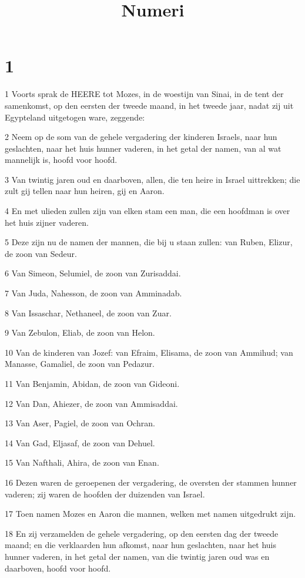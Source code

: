 

\title{Numeri}



\chapter{1}

\par 1 Voorts sprak de HEERE tot Mozes, in de woestijn van Sinai, in de tent der samenkomst, op den eersten der tweede maand, in het tweede jaar, nadat zij uit Egypteland uitgetogen ware, zeggende:
\par 2 Neem op de som van de gehele vergadering der kinderen Israels, naar hun geslachten, naar het huis hunner vaderen, in het getal der namen, van al wat mannelijk is, hoofd voor hoofd.
\par 3 Van twintig jaren oud en daarboven, allen, die ten heire in Israel uittrekken; die zult gij tellen naar hun heiren, gij en Aaron.
\par 4 En met ulieden zullen zijn van elken stam een man, die een hoofdman is over het huis zijner vaderen.
\par 5 Deze zijn nu de namen der mannen, die bij u staan zullen: van Ruben, Elizur, de zoon van Sedeur.
\par 6 Van Simeon, Selumiel, de zoon van Zurisaddai.
\par 7 Van Juda, Nahesson, de zoon van Amminadab.
\par 8 Van Issaschar, Nethaneel, de zoon van Zuar.
\par 9 Van Zebulon, Eliab, de zoon van Helon.
\par 10 Van de kinderen van Jozef: van Efraim, Elisama, de zoon van Ammihud; van Manasse, Gamaliel, de zoon van Pedazur.
\par 11 Van Benjamin, Abidan, de zoon van Gideoni.
\par 12 Van Dan, Ahiezer, de zoon van Ammisaddai.
\par 13 Van Aser, Pagiel, de zoon van Ochran.
\par 14 Van Gad, Eljasaf, de zoon van Dehuel.
\par 15 Van Nafthali, Ahira, de zoon van Enan.
\par 16 Dezen waren de geroepenen der vergadering, de oversten der stammen hunner vaderen; zij waren de hoofden der duizenden van Israel.
\par 17 Toen namen Mozes en Aaron die mannen, welken met namen uitgedrukt zijn.
\par 18 En zij verzamelden de gehele vergadering, op den eersten dag der tweede maand; en die verklaarden hun afkomst, naar hun geslachten, naar het huis hunner vaderen, in het getal der namen, van die twintig jaren oud was en daarboven, hoofd voor hoofd.

